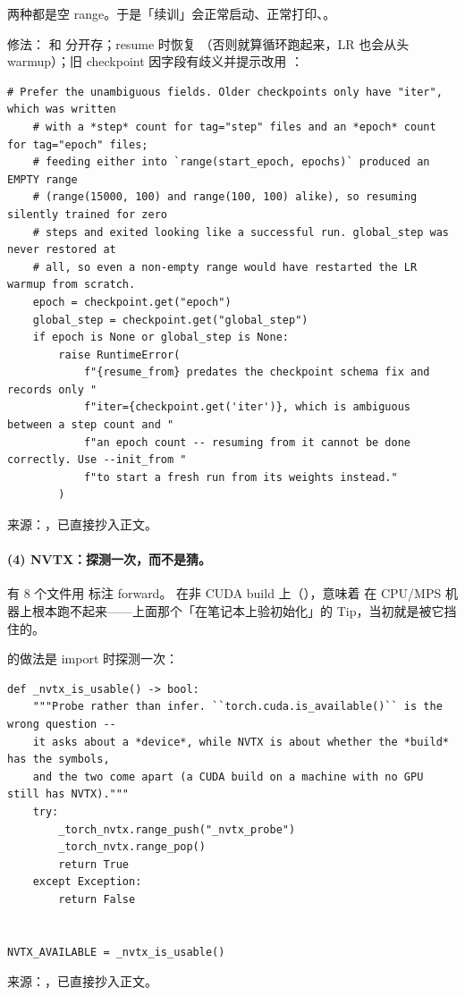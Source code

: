 两种都是空 range。于是「续训」会正常启动、正常打印、。

修法： 和  分开存；resume 时恢复 （否则就算循环跑起来，LR 也会从头 warmup）；旧 checkpoint 因字段有歧义并提示改用 ：

\begin{lstlisting}[style=hlnum, firstnumber=179]
    # Prefer the unambiguous fields. Older checkpoints only have "iter", which was written
    # with a *step* count for tag="step" files and an *epoch* count for tag="epoch" files;
    # feeding either into `range(start_epoch, epochs)` produced an EMPTY range
    # (range(15000, 100) and range(100, 100) alike), so resuming silently trained for zero
    # steps and exited looking like a successful run. global_step was never restored at
    # all, so even a non-empty range would have restarted the LR warmup from scratch.
    epoch = checkpoint.get("epoch")
    global_step = checkpoint.get("global_step")
    if epoch is None or global_step is None:
        raise RuntimeError(
            f"{resume_from} predates the checkpoint schema fix and records only "
            f"iter={checkpoint.get('iter')}, which is ambiguous between a step count and "
            f"an epoch count -- resuming from it cannot be done correctly. Use --init_from "
            f"to start a fresh run from its weights instead."
        )
\end{lstlisting}
\noindent 来源：，已直接抄入正文。

\paragraph{(4) NVTX：探测一次，而不是猜。} 有 8 个文件用  标注 forward。 在非 CUDA build 上（），意味着  在 CPU/MPS 机器上根本跑不起来——上面那个「在笔记本上验初始化」的 Tip，当初就是被它挡住的。

 的做法是 import 时探测一次：

\begin{lstlisting}[style=hlnum, firstnumber=32]
def _nvtx_is_usable() -> bool:
    """Probe rather than infer. ``torch.cuda.is_available()`` is the wrong question --
    it asks about a *device*, while NVTX is about whether the *build* has the symbols,
    and the two come apart (a CUDA build on a machine with no GPU still has NVTX)."""
    try:
        _torch_nvtx.range_push("_nvtx_probe")
        _torch_nvtx.range_pop()
        return True
    except Exception:
        return False


NVTX_AVAILABLE = _nvtx_is_usable()
\end{lstlisting}
\noindent 来源：，已直接抄入正文。

